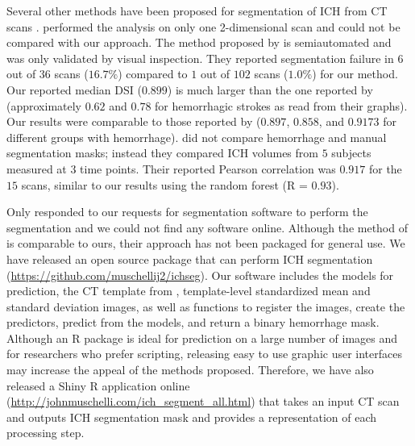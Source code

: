 \documentclass{elsarticle_nonatbib}\usepackage[]{graphicx}\usepackage[]{color}
\begin{document}
Several other methods have been proposed for segmentation of ICH from CT scans \citep{ gillebert_automated_2014, prakash_segmentation_2012, loncaric_hierarchical_1996, loncaric_quantitative_1999, perez_set_2007}.  \citet{loncaric_hierarchical_1996} performed the analysis on only one 2-dimensional scan and could not be compared with our approach.  The method proposed by \citet{perez_set_2007} is semiautomated and was only validated by visual inspection.  They reported segmentation failure in $6$ out of $36$ scans ($16.7\%$) compared to $1$ out of $102$ scans ($1.0\%$) for our method.   Our reported median DSI ($0.899$) is much larger than the one reported by \citet{gillebert_automated_2014} (approximately $0.62$ and $0.78$ for hemorrhagic strokes as read from their graphs). Our results were comparable to those reported by \citet{prakash_segmentation_2012} ($0.897$, $0.858$, and $0.9173$ for different groups with hemorrhage). \citet{loncaric_quantitative_1999} did not compare hemorrhage and manual segmentation masks; instead they compared ICH volumes from $5$ subjects measured at $3$ time points.  Their reported Pearson correlation was $0.917$ for the $15$ scans, similar to our results using the random forest (R = $0.93$).

Only \citet{gillebert_automated_2014} responded to our requests for segmentation software to perform the segmentation and we could not find any software online.  Although the method of \citet{gillebert_automated_2014} is comparable to ours, their approach has not been packaged for general use.  We have released an open source package that can perform ICH segmentation (\url{https://github.com/muschellij2/ichseg}).  Our software includes the models for prediction, the CT template from \citet{rorden_age-specific_2012}, template-level standardized mean and standard deviation images, as well as functions to register the images, create the predictors, predict from the models, and return a binary hemorrhage mask.  Although an R package is ideal for prediction on a large number of images and for researchers who prefer scripting, releasing easy to use graphic user interfaces may increase the appeal of the methods proposed. Therefore, we have also released a Shiny \citep{shiny} R application online (\url{http://johnmuschelli.com/ich_segment_all.html}) that takes an input CT scan and outputs ICH segmentation mask and provides a representation of each processing step.
\end{document}

